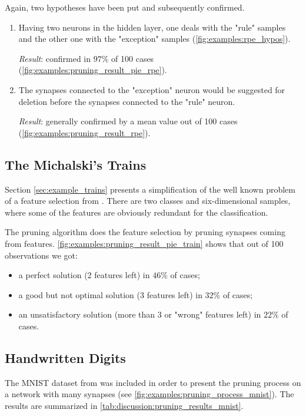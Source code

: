 Again, two hypotheses have been put and subsequently confirmed.

\begin{enumerate}
\item Having two neurons in the hidden layer, one deals with the "rule" samples and the other one with the "exception" samples (\cref{fig:examples:rpe_hypos}).

\textit{Result}: confirmed in $ 97\% $ of 100 cases (\cref{fig:examples:pruning_result_pie_rpe}).

\item The synapses connected to the "exception" neuron would be suggested for deletion before the synapses connected to the "rule" neuron.

\textit{Result}: generally confirmed by a mean value out of 100 cases (\cref{fig:examples:pruning_result_rpe}).
\end{enumerate}

\subsection*{The Michalski's Trains}
Section \ref{sec:example_trains} presents a simplification of the well known problem of a feature selection from \citep{michalski:trains}. There are two classes and six-dimensional samples, where some of the features are obviously redundant for the classification.

The pruning algorithm does the feature selection by pruning synapses coming from features. \cref{fig:examples:pruning_result_pie_train} shows that out of 100 observations we got:
\begin{itemize}
\item a perfect solution (2 features left) in $ 46\% $ of cases;
\item a good but not optimal solution (3 features left) in $ 32\% $ of cases;
\item an unsatisfactory solution (more than 3 or "wrong" features left) in $ 22\% $ of cases.
\end{itemize}

\subsection*{Handwritten Digits}
The MNIST dataset from \citep{lecun:mnist} was included in order to present the pruning process on a network with many synapses (see \cref{fig:examples:pruning_process_mnist}). The results are summarized in \cref{tab:discussion:pruning_results_mnist}.

